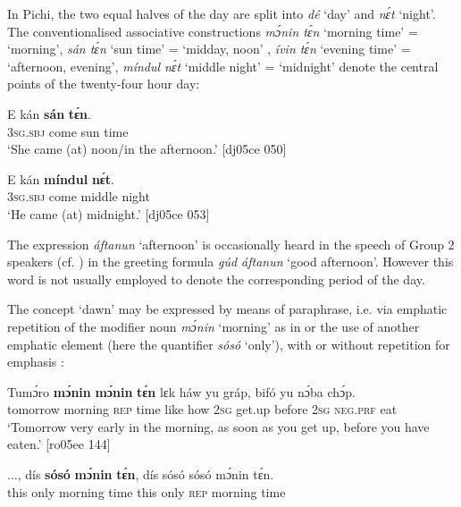 In Pichi, the two equal halves of the day are split into \textit{dé} ‘day’ and \textit{nɛ́t} ‘night’. The conventionalised associative constructions \textit{mɔ́nin tɛ́n} ‘morning time’ = ‘morning’, \textit{sán tɛ́n} ‘sun time’ = ‘midday, noon’ , \textit{ívin tɛ́n} ‘evening time’ = ‘afternoon, evening’, \textit{míndul nɛ́t} ‘middle night’ = ‘midnight’  denote the central points of the twenty-four hour day:{\fff}


\ea%
    \label{ex:key:995}
    \gll E    kán    \textbf{sán}  \textbf{tɛ́n}.\\
\textsc{3sg.sbj}  come  sun  time\\

\glt ‘She came (at) noon/in the afternoon.’ [dj05ce 050]
\z


\ea%
    \label{ex:key:996}
    \gll E    kán    \textbf{míndul}  \textbf{nɛ́t}.\\
\textsc{3sg.sbj}  come  middle  night\\

\glt ‘He came (at) midnight.’ [dj05ce 053]
\z

The expression \textit{áftanun} ‘afternoon’ is occasionally heard in the speech of Group 2 speakers (cf. ) in the greeting formula \textit{gúd áftanun} ‘good afternoon’. However this word is not usually employed to denote the corresponding period of the day.


The concept ‘dawn’ may be expressed by means of paraphrase, i.e. via emphatic repetition of the modifier noun \textit{mɔ́nin} ‘morning’ as in  or the use of another emphatic element (here the quantifier \textit{sósó} ‘only’), with or without repetition for emphasis :



\ea%
    \label{ex:key:997}
    \gll Tumɔ́ro    \textbf{mɔ́nin}  \textbf{mɔ́nin}  \textbf{tɛ́n}    lɛk  háw  yu  gráp,
bifó    yu  nɔ́ba  chɔ́p.\\
tomorrow  morning  \textsc{rep}    time    like  how  \textsc{2sg}  get.up 
before  \textsc{2sg}  \textsc{neg}.\textsc{prf}  eat\\
\glt ‘Tomorrow very early in the morning, as soon as you get up, 
before you have eaten.’ [ro05ee 144]
\z


\ea%
    \label{ex:key:998}
    \gll \op...\cp{},  dís  \textbf{sósó}    \textbf{mɔ́nin}  \textbf{tɛ́n},  dís  sósó    sósó    mɔ́nin  tɛ́n.\\
{}  this  only    morning  time  this  only    \textsc{rep}    morning  time\\

